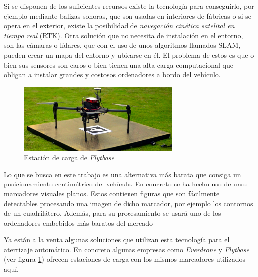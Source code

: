 Si se disponen de los suficientes recursos existe la tecnología para conseguirlo, por ejemplo mediante balizas sonoras, que son usadas en interiores de fábricas o si se opera en el exterior, existe la posibilidad de  \textit{navegación cinética satelital en tiempo real} (RTK). Otra solución que no necesita de instalación en el entorno, son las cámaras o lídares, que con el uso de unos algoritmos llamados SLAM, pueden crear un mapa del entorno y ubicarse en él. El problema de estos es que o bien sus sensores son caros o bien tienen una alta carga computacional que obligan a instalar grandes y costosos ordenadores a bordo del vehículo. 

\begin{figure}[b]
\includegraphics[width=0.7\textwidth]{introduccion/flytbase_en.jpg}
\caption{Estación de carga de \textit{Flytbase}}
\label{fig:flyt}
\end{figure}

Lo que se busca en este trabajo es una alternativa más barata que consiga un posicionamiento centimétrico del vehículo. En concreto se ha hecho uso de unos marcadores visuales planos. Estos contienen figuras que son fácilmente detectables procesando una imagen de dicho marcador, por ejemplo los contornos de un cuadrilátero. Además, para su procesamiento se usará uno de los ordenadores embebidos más baratos del mercado 

 
Ya están a la venta algunas soluciones que utilizan esta tecnología para el aterrizaje automático. En concreto algunas  empresas como \textit{Everdrone} \cite{everdrone} y \textit{Flytbase} (ver figura \ref{fig:flyt}) ofrecen estaciones de carga con los mismos marcadores utilizados aquí. 

